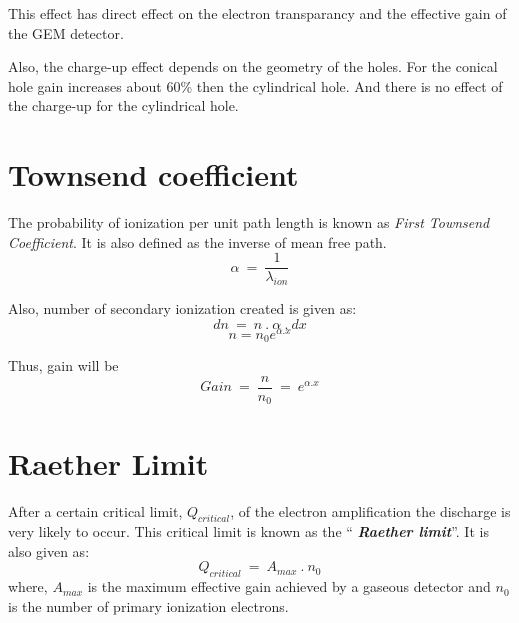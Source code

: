 This effect has direct effect on the electron transparancy and the effective gain of the GEM detector.

Also, the charge-up effect depends on the geometry of the holes. For the conical hole gain increases about 60\% then the cylindrical hole. And there is no effect of the charge-up for the cylindrical hole.



\section{Townsend coefficient} %
\label{sec:townsend_coefficient}
The probability of ionization per unit path length is known as \textit{First Townsend Coefficient}. It is also defined as the inverse of mean free path.
\begin{equation}
	\alpha~=~\frac{1}{\lambda_{ion}}
\end{equation}

Also, number of secondary ionization created is given as:
\begin{equation}
	dn~=~n~.~\alpha~.~dx
\end{equation}
\begin{equation}
	n=n_0 e^{\alpha.x}
\end{equation}

Thus, gain will be
\begin{equation}
	Gain~=~\frac{n}{n_0}~=~e^{\alpha.x}
\end{equation}

\section{Raether Limit} %
\label{sec:raether_limit}
After a certain critical limit, $Q_{critical}$, of the electron amplification the discharge is very likely to occur. This critical limit is known as the ``\textit{ \textbf{Raether limit}}''.
It is also given as:
\begin{equation}
	Q_{critical}~=~A_{max}~.~n_0
\end{equation}
where, $A_{max}$ is the maximum effective gain achieved by a gaseous detector and $n_0$ is the number of primary ionization electrons.

